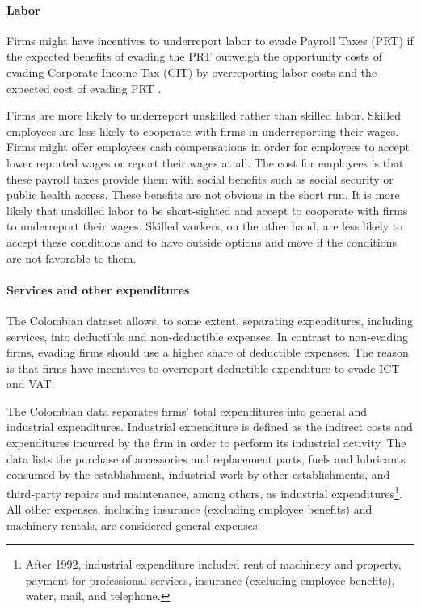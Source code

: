 \documentclass[
  12pt]{article}
\let\oldparagraph\paragraph
\renewcommand{\paragraph}[1]{\oldparagraph{#1}\mbox{}}
\theoremstyle{definition}
\theoremstyle{remark}
\begin{document}
\paragraph{Labor}\label{labor}

Firms might have incentives to underreport labor to evade Payroll Taxes
(PRT) if the expected benefits of evading the PRT outweigh the
opportunity costs of evading Corporate Income Tax (CIT) by overreporting
labor costs and the expected cost of evading PRT \citep{Almunia2018}.

Firms are more likely to underreport unskilled rather than skilled
labor. Skilled employees are less likely to cooperate with firms in
underreporting their wages. Firms might offer employees cash
compensations in order for employees to accept lower reported wages or
report their wages at all. The cost for employees is that these payroll
taxes provide them with social benefits such as social security or
public health access. These benefits are not obvious in the short run.
It is more likely that unskilled labor to be short-sighted and accept to
cooperate with firms to underreport their wages. Skilled workers, on the
other hand, are less likely to accept these conditions and to have
outside options and move if the conditions are not favorable to them.

\paragraph{Services and other
expenditures}\label{services-and-other-expenditures}

The Colombian dataset allows, to some extent, separating expenditures,
including services, into deductible and non-deductible expenses. In
contrast to non-evading firms, evading firms should use a higher share
of deductible expenses. The reason is that firms have incentives to
overreport deductible expenditure to evade ICT and VAT.

The Colombian data separates firms' total expenditures into general and
industrial expenditures. Industrial expenditure is defined as the
indirect costs and expenditures incurred by the firm in order to perform
its industrial activity. The data lists the purchase of accessories and
replacement parts, fuels and lubricants consumed by the establishment,
industrial work by other establishments, and third-party repairs and
maintenance, among others, as industrial expenditures\footnote{After
  1992, industrial expenditure included rent of machinery and property,
  payment for professional services, insurance (excluding employee
  benefits), water, mail, and telephone.}. All other expenses, including
insurance (excluding employee benefits) and machinery rentals, are
considered general expenses.
\end{document}
